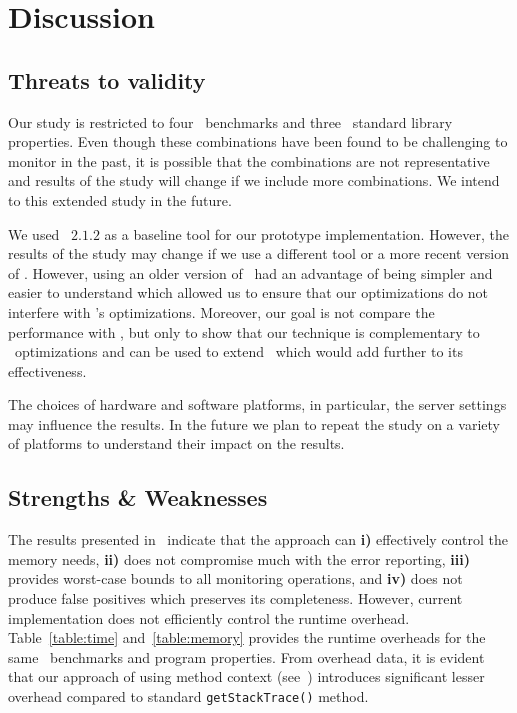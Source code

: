 \section{Discussion}
\label{sec:discussion}

\subsection{Threats to validity}
\label{sec:discussion:ttv}

Our study is restricted to four \dacapo~benchmarks and three \java~standard
library properties. Even though these combinations have been found to be
challenging to monitor in the past, it is possible that the combinations are not
representative and results of the study will change if we include more
combinations. We intend to this extended study in the future.

We used \javamop\ $2.1.2$ as a baseline tool for our prototype implementation. 
However, the results of the study may change if we use a different tool or a 
more recent version of \javamop. However, using an older version of \javamop~had 
an advantage of being simpler and easier to understand which allowed us to 
ensure that our optimizations do not interfere with \javamop's optimizations. 
Moreover, our goal is not compare the performance with \javamop, but only to show 
that our technique is complementary to \javamop\ optimizations and can be used to 
extend \javamop\ which would add further to its effectiveness.

The choices of hardware and software platforms, in particular, the server 
settings may influence the results. In the future we plan to repeat the study on 
a variety of platforms to understand their impact on the results.

\subsection{Strengths \& Weaknesses}
\label{sec:discussion:snw}

The results presented in~ indicate that the approach can 
\textbf{i)} effectively control the memory needs, \textbf{ii)} does not
compromise much with the error reporting, \textbf{iii)} provides worst-case
bounds to all monitoring operations, and \textbf{iv)} does not produce false
positives which preserves its completeness.
However, current implementation does not efficiently control the runtime 
overhead. Table~\ref{table:time} and~\ref{table:memory} provides the runtime
overheads for the same \dacapo\ benchmarks and program properties. From overhead
data, it is evident that our approach of using method context
(see~) introduces significant lesser overhead compared to
standard \texttt{getStackTrace()} method.
